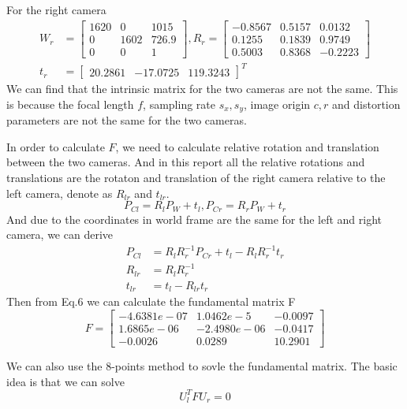 \documentclass{article}
\begin{document}
For the right camera
\begin{align*}
W_r &= \begin{bmatrix}
1620&0&1015\\0&1602&726.9\\0&0&1
\end{bmatrix},
R_r = \begin{bmatrix}
-0.8567&0.5157&0.0132\\
0.1255&0.1839&0.9749\\
0.5003&0.8368&-0.2223
\end{bmatrix}
\\
t_r &= \begin{bmatrix}
20.2861&-17.0725&119.3243
\end{bmatrix}^T
\end{align*}
We can find that the intrinsic matrix for the two cameras are not the same. This is because the focal length $f$, sampling rate $s_x,s_y$, image origin $c,r$ and distortion parameters are not the same for the two cameras.
\par
In order to calculate $F$, we need to calculate relative rotation and translation between the two cameras. And in this report all the relative rotations and translations are the rotaton and translation of the right camera relative to the left camera, denote as $R_{lr}$ and $t_{lr}$.
\begin{equation}
P_{Cl} =R_lP_W+t_l,P_{Cr} =R_rP_W+t_r
\end{equation}
And due to the coordinates in world frame are the same for the left and right camera, we can derive
\begin{align}
P_{Cl}&=R_lR_r^{-1}P_{Cr}+t_l-R_lR_r^{-1}t_r\\
R_{lr}&=R_lR_r^{-1}\\
t_{lr}&=t_l-R_{lr}t_r
\end{align}
Then from Eq.6 we can calculate the fundamental matrix F
\begin{equation*}
F=
\begin{bmatrix}
-4.6381e-07&1.0462e-5&-0.0097\\
1.6865e-06&-2.4980e-06&-0.0417\\
-0.0026&0.0289&10.2901
\end{bmatrix}
\end{equation*}
\par
We can also use the 8-points method to sovle the fundamental matrix. The basic idea is that we can solve 
\begin{equation}U_l^TFU_r=0\end{equation}
\end{document}
